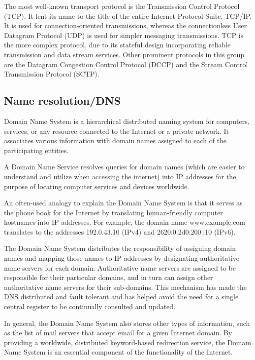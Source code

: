 \documentclass[a4paper,oneside]{report}
\begin{document}
	 The most well-known transport protocol is the Transmission Control Protocol (TCP). It lent its name to the title of the entire Internet Protocol Suite, TCP/IP. It is used for connection-oriented transmissions, whereas the connectionless User Datagram Protocol (UDP) is used for simpler messaging transmissions. TCP is the more complex protocol, due to its stateful design incorporating reliable transmission and data stream services. Other prominent protocols in this group are the Datagram Congestion Control Protocol (DCCP) and the Stream Control Transmission Protocol (SCTP).


    	\subsection{Name resolution/DNS}
	Domain Name System  is a hierarchical distributed naming system for computers, services, or any resource connected to the Internet or a private network. It associates various information with domain names assigned to each of the participating entities.

	  A Domain Name Service resolves queries for domain names (which are easier to understand and utilize when accessing the internet) into IP addresses for the purpose of locating computer services and devices worldwide.

	 An often-used analogy to explain the Domain Name System is that it serves as the phone book for the Internet by translating human-friendly computer hostnames into IP addresses. For example, the domain name www.example.com translates to the addresses 192.0.43.10 (IPv4) and 2620:0:2d0:200::10 (IPv6).
	
	The Domain Name System distributes the responsibility of assigning domain names and mapping those names to IP addresses by designating authoritative name servers for each domain. Authoritative name servers are assigned to be responsible for their particular domains, and in turn can assign other authoritative name servers for their sub-domains. This mechanism has made the DNS distributed and fault tolerant and has helped avoid the need for a single central register to be continually consulted and updated.

	 In general, the Domain Name System also stores other types of information, such as the list of mail servers that accept email for a given Internet domain. By providing a worldwide, distributed keyword-based redirection service, the Domain Name System is an essential component of the functionality of the Internet.
\end{document}
